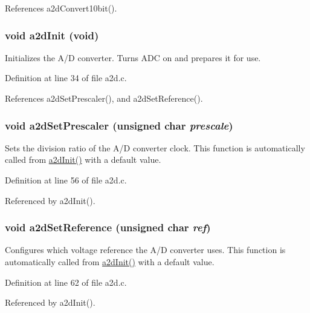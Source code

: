 References a2dConvert10bit().\hypertarget{group__a2d_gd5a448cf42b0d27dccd39dd2ff10c191}{
\subsubsection[{a2dInit}]{\setlength{\rightskip}{0pt plus 5cm}void a2dInit (void)}}
\label{group__a2d_gd5a448cf42b0d27dccd39dd2ff10c191}


Initializes the A/D converter. Turns ADC on and prepares it for use. 

Definition at line 34 of file a2d.c.

References a2dSetPrescaler(), and a2dSetReference().\hypertarget{group__a2d_gb062433b6cb21b50aa94e896bcd93b87}{
\subsubsection[{a2dSetPrescaler}]{\setlength{\rightskip}{0pt plus 5cm}void a2dSetPrescaler (unsigned char {\em prescale})}}
\label{group__a2d_gb062433b6cb21b50aa94e896bcd93b87}


Sets the division ratio of the A/D converter clock. This function is automatically called from \hyperlink{group__a2d_gd5a448cf42b0d27dccd39dd2ff10c191}{a2dInit()} with a default value. 

Definition at line 56 of file a2d.c.

Referenced by a2dInit().\hypertarget{group__a2d_g42bd5d9230c972339592df77a25d85ff}{
\subsubsection[{a2dSetReference}]{\setlength{\rightskip}{0pt plus 5cm}void a2dSetReference (unsigned char {\em ref})}}
\label{group__a2d_g42bd5d9230c972339592df77a25d85ff}


Configures which voltage reference the A/D converter uses. This function is automatically called from \hyperlink{group__a2d_gd5a448cf42b0d27dccd39dd2ff10c191}{a2dInit()} with a default value. 

Definition at line 62 of file a2d.c.

Referenced by a2dInit().